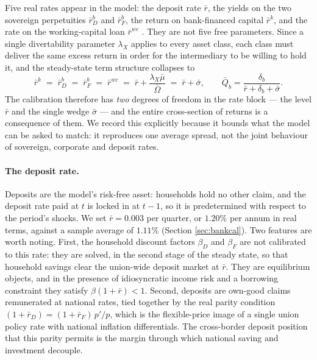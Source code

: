 Five real rates appear in the model: the deposit rate $\bar r$, the yields on the
two sovereign perpetuities $\bar r^{b}_{D}$ and $\bar r^{b}_{F}$, the return on
bank-financed capital $\bar r^{k}$, and the rate on the working-capital loan
$\bar r^{wc}$ \citep{neumeyerperri2005}. They are not five free parameters. Since
a single divertability parameter $\lambda_X$ applies to every asset class, each
class must deliver the same excess return in order for the intermediary to be
willing to hold it, and the steady-state term structure collapses to
\begin{equation}
\bar r^{k}\;=\;\bar r^{b}_{D}\;=\;\bar r^{b}_{F}\;=\;\bar r^{wc}
\;=\;\bar r+\frac{\lambda_X\bar\mu}{\bar\Omega}\;=\;\bar r+\bar\sigma ,
\qquad
\bar Q_b=\frac{\delta_b}{\bar r+\delta_b+\bar\sigma}.
\label{eq:rate-structure}
\end{equation}
The calibration therefore has \emph{two} degrees of freedom in the rate block ---
the level $\bar r$ and the single wedge $\bar\sigma$ --- and the entire
cross-section of returns is a consequence of them. We record this explicitly
because it bounds what the model can be asked to match: it reproduces one
average spread, not the joint behaviour of sovereign, corporate and deposit
rates.

\paragraph{The deposit rate.}
Deposits are the model's risk-free asset: households hold no other claim, and
the deposit rate paid at $t$ is locked in at $t-1$, so it is predetermined with
respect to the period's shocks. We set $\bar r=0.003$ per quarter, or $1.20\%$
per annum in real terms, against a sample average of $1.11\%$ (Section
\ref{sec:bankcal}). Two features are worth noting. First, the household
discount factors $\beta_D$ and $\beta_F$ are not calibrated to this rate: they
are solved, in the second stage of the steady state, so that household savings
clear the union-wide deposit market at $\bar r$. They are equilibrium objects,
and in the presence of idiosyncratic income risk and a borrowing constraint they
satisfy $\beta(1+\bar r)<1$. Second, deposits are own-good claims remunerated at
national rates, tied together by the real parity condition
$(1+\bar r_{D})=(1+\bar r_{F})\,p'/p$, which is the flexible-price image of a
single union policy rate with national inflation differentials. The cross-border
deposit position that this parity permits is the margin through which national
saving and investment decouple.

